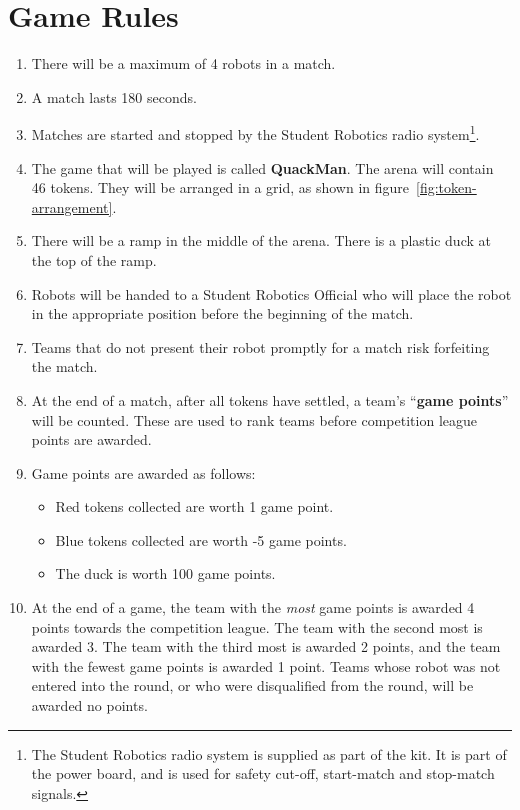 \section {Game Rules}
\label{game-rules}

\begin{enumerate}
\item There will be a maximum of 4 robots in a match.
\item A match lasts 180 seconds.
\item Matches are started and stopped by the Student Robotics radio system\footnote{The Student Robotics radio system is supplied as part of the kit.
 It is part of the power board, and is used for safety cut-off, start-match and stop-match signals.}.
\item The game that will be played is called \textbf{QuackMan}.  The arena will contain 46 tokens.  They will be arranged in a grid, as shown in figure~\ref{fig:token-arrangement}.
\item There will be a ramp in the middle of the arena.  There is a plastic duck at the top of the ramp.
\item Robots will be handed to a Student Robotics Official who will place the robot in the appropriate position before the beginning of the match.
\item Teams that do not present their robot promptly for a match risk forfeiting the match.

\item At the end of a match, after all tokens have settled, a team's ``\textbf{game points}'' will be counted.
 These are used to rank teams before competition league points are awarded.

\item Game points are awarded as follows:
\begin{itemize}
\item Red tokens collected are worth 1 game point.
\item Blue tokens collected are worth -5 game points.
\item The duck is worth 100 game points.
\end{itemize}

\item At the end of a game, the team with the \emph{most} game points is awarded 4 points towards the competition league.
 The team with the second most is awarded 3.
 The team with the third most is awarded 2 points, and the team with the fewest game points is awarded 1 point.
 Teams whose robot was not entered into the round, or who were disqualified from the round, will be awarded no points.
\end{enumerate}

